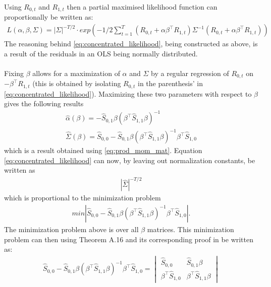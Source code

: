 \begin{bevis}
    Using $R_{0,t}$ and $R_{1,t}$ then a partial maximised likelihood function can proportionally be written as:
    \begin{align}\label{eq:concentrated_likelihood}
        L(\alpha,\beta,\Sigma)=|\Sigma|^{-T/2}\cdot exp\left(-1/2\sum_{t=1}^T\left(R_{0,t}+\alpha\beta^{\top} R_{1,t}\right)\Sigma^{-1}\left(R_{0,t}+\alpha\beta^{\top} R_{1,t}\right)\right)
    \end{align}
    The reasoning behind \eqref{eq:concentrated_likelihood}, being constructed as above, is a result of the residuals in an OLS being normally distributed.\\\\
 Fixing $\beta$ allows for a maximization of $\alpha$ and $\Sigma$ by a regular regression of $R_{0,t}$ on $-\beta^\top R_{1,t}$ (this is obtained by isolating $R_{0,t}$ in the parenthesis' in \eqref{eq:concentrated_likelihood}). Maximizing these two parameters with respect to $\beta$ gives the following results
 \begin{align}\label{eq:max_alphaandsigma}
     \hat{\alpha}(\beta)=-\hat{S}_{0,1}\beta(\beta^\top \hat{S}_{1,1}\beta)^{-1}\\
     \hat{\Sigma}(\beta)=\hat{S}_{0,0}-\hat{S}_{0,1}\beta\left(\beta^\top \hat{S}_{1,1}\beta\right)^{-1}\beta^\top \hat{S}_{1,0}
 \end{align}
 which is a result obtained using \eqref{eq:prod_mom_mat}. Equation \eqref{eq:concentrated_likelihood} can now, by leaving out normalization constants, be written as
 \begin{align*}
     |\hat{\Sigma}|^{-T/2}
 \end{align*}
 which is proportional to the minimization problem
 \begin{align}
     min|\hat{S}_{0,0}-\hat{S}_{0,1}\beta\left(\beta^\top \hat{S}_{1,1}\beta\right)^{-1}\beta^\top \hat{S}_{1,0}|.%
 \end{align}
 The minimization problem above is over all $\beta$ matrices. This minimization problem can then using Theorem A.16 and its corresponding proof in \cite{Linear_Models:_Least_Squares_and_Alternatives_Second_Edition} be written as:
 \begin{align*}
     \hat{S}_{0,0}-\hat{S}_{0,1}\beta\left(\beta^\top \hat{S}_{1,1}\beta\right)^{-1}\beta^\top \hat{S}_{1,0}=\begin{vmatrix}
         \hat{S}_{0,0}&\hat{S}_{0,1}\beta\\
         \beta^{\top}\hat{S}_{1,0}&\beta^{\top} \hat{S}_{1,1}\beta\end{vmatrix}\\

\end{align*}
\end{bevis}
